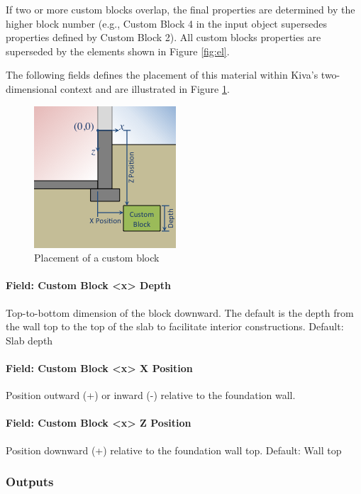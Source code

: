 If two or more custom blocks overlap, the final properties are
determined by the higher block number (e.g., Custom Block 4 in the input
object supersedes properties defined by Custom Block 2). All custom
blocks properties are superseded by the elements shown in Figure
\ref{fig:el}.

The following fields defines the placement of this material within
Kiva's two-dimensional context and are illustrated in Figure
\ref{fig:custom}.

\begin{figure}
\centering
\includegraphics{media/kiva-2d-custom.png}
\caption{Placement of a custom block\label{fig:custom}}
\end{figure}

\paragraph{Field: Custom Block \textless{}x\textgreater{}
Depth}

Top-to-bottom dimension of the block downward. The default is the depth
from the wall top to the top of the slab to facilitate interior
constructions. Default: Slab depth

\paragraph{Field: Custom Block \textless{}x\textgreater{} X
Position}

Position outward (+) or inward (-) relative to the foundation wall.

\paragraph{Field: Custom Block \textless{}x\textgreater{} Z
Position}

Position downward (+) relative to the foundation wall top. Default: Wall
top

\subsubsection{Outputs}

